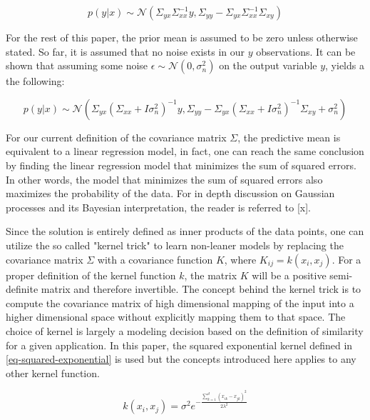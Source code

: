 \documentclass[a4paper,12pt]{article}
\begin{document}
\begin{equation}
\label{eq-conditional-zero-mean}
p(y|x) \sim  \mathcal{N} \left ( \Sigma_{yx}\Sigma_{xx}^{-1}y, \Sigma_{yy}-\Sigma_{yx}\Sigma_{xx}^{-1}\Sigma_{xy}\right )
\end{equation}

For the rest of this paper, the prior mean is assumed to be zero unless otherwise stated. So far, it is assumed that no noise exists in our $y$ observations. It can be shown that assuming some noise $\epsilon \sim \mathcal{N}\left(0,\sigma_{n}^{2}\right)$ on the output variable $y$, yields a the following:

\begin{equation}
\label{eq-mean-variance-noise}
p(y|x) \sim  \mathcal{N} \left ( \Sigma_{yx}\left(\Sigma_{xx}+I\sigma_{n}^{2}\right)^{-1}y, \Sigma_{yy}-\Sigma_{yx}\left(\Sigma_{xx}+I\sigma_{n}^{2}\right)^{-1}\Sigma_{xy}+\sigma_{n}^{2}\right )
\end{equation}

For our current definition of the covariance matrix $\Sigma$, the predictive mean is equivalent to a linear regression model, in fact, one can reach the same conclusion by finding the linear regression model that minimizes the sum of squared errors. In other words, the model that minimizes the sum of squared errors also maximizes the probability of the data. For in depth discussion on Gaussian processes and its Bayesian interpretation, the reader is referred to [x].

Since the solution is entirely defined as inner products of the data points, one can utilize the so called "kernel trick" to learn non-leaner models by replacing the covariance matrix $\Sigma$ with a covariance function $K$, where $K_{ij} = k(x_{i},x_{j})$. For a proper definition of the kernel function $k$, the matrix $K$ will be a positive semi-definite matrix and therefore invertible. The concept behind the kernel trick is to compute the covariance matrix of high dimensional mapping of the input into a higher dimensional space without explicitly mapping them to that space. The choice of kernel is largely a modeling decision based on the definition of similarity for a given application. In this paper, the squared exponential kernel defined in \eqref{eq-squared-exponential} is used but the concepts introduced here applies to any other kernel function.

\begin{equation}
\label{eq-squared-exponential}
k(x_{i},x_{j}) = \sigma^{2}e^{-\frac{\sum_{k=1}^{d}(x_{ik}-x_{jk})^{2}}{2\lambda^{2}}}
\end{equation}
\end{document}
